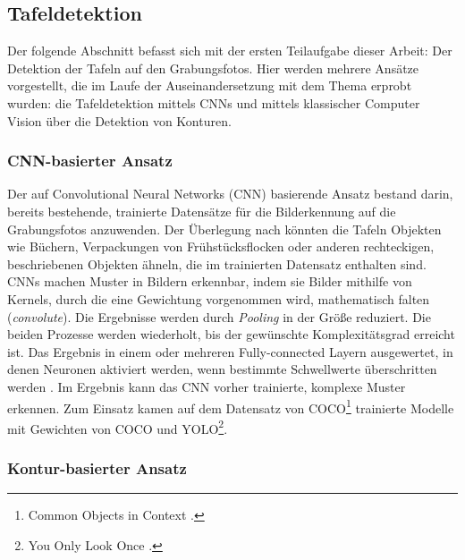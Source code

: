 \subsection{Tafeldetektion}

Der folgende Abschnitt befasst sich mit der ersten Teilaufgabe dieser Arbeit: Der Detektion der Tafeln auf den Grabungsfotos. Hier werden mehrere Ansätze vorgestellt, die im Laufe der Auseinandersetzung mit dem Thema erprobt wurden: die Tafeldetektion mittels CNNs und mittels klassischer Computer Vision über die Detektion von Konturen.

\subsubsection{CNN-basierter Ansatz}

Der auf Convolutional Neural Networks (CNN) basierende Ansatz bestand darin, bereits bestehende, trainierte Datensätze für die Bilderkennung auf die Grabungsfotos anzuwenden. Der Überlegung nach könnten die Tafeln Objekten wie Büchern, Verpackungen von Frühstücksflocken oder anderen rechteckigen, beschriebenen Objekten ähneln, die im trainierten Datensatz enthalten sind.
CNNs machen Muster in Bildern erkennbar, indem sie Bilder mithilfe von Kernels, durch die eine Gewichtung vorgenommen wird, mathematisch falten (\textit{convolute}). Die Ergebnisse werden durch \textit{Pooling} in der Größe reduziert. Die beiden Prozesse werden wiederholt, bis der gewünschte Komplexitätsgrad erreicht ist. Das Ergebnis in einem oder mehreren Fully-connected Layern ausgewertet, in denen Neuronen aktiviert werden, wenn bestimmte Schwellwerte überschritten werden \cite{introduction}. Im Ergebnis kann das CNN vorher trainierte, komplexe Muster erkennen. Zum Einsatz kamen auf dem Datensatz von COCO\footnote{Common Objects in Context \cite{coco}.} trainierte Modelle mit Gewichten von COCO und YOLO\footnote{You Only Look Once \cite{yolo} \cite{yolo2}.}.


\subsubsection{Kontur-basierter Ansatz}

